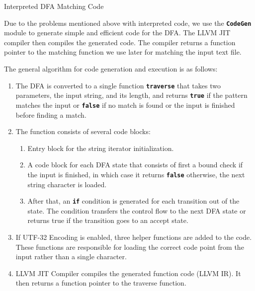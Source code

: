 \begin{listing}[htbp]
\inputminted[breaklines=true,frame=lines,linenos]{cpp}{code/interpretted.cpp}
\caption[Interpreted DFA Code]{Interpreted DFA Matching Code}
\label{lst:dfainterpreted}
\end{listing}

Due to the problems mentioned above with interpreted code, we use the \texttt{\textbf{CodeGen}} module to generate simple and efficient code for the DFA. The LLVM JIT compiler then compiles the generated code. The compiler returns a function pointer to the matching function we use later for matching the input text file.

The general algorithm for code generation and execution is as follows:
\begin{enumerate}
    \item The DFA is converted to a single function \texttt{\textbf{traverse}} that takes two parameters, the input string, and its length, and returns \texttt{\textbf{true}} if the pattern matches the input or \texttt{\textbf{false}} if no match is found or the input is finished before finding a match.
    \item The function consists of several code blocks:
    \begin{enumerate}
        \item Entry block for the string iterator initialization.
        \item A code block for each DFA state that consists of first a bound check if the input is finished, in which case it returns \texttt{\textbf{false}} otherwise, the next string character is loaded.
        \item After that, an \texttt{\textbf{if}} condition is generated for each transition out of the state. The condition transfers the control flow to the next DFA state or returns true if the transition goes to an accept state.
    \end{enumerate}
    \item If UTF-32 Encoding is enabled, three helper functions are added to the code. These functions are responsible for loading the correct code point from the input rather than a single character.
    \item LLVM JIT Compiler compiles the generated function code (LLVM IR). It then returns a function pointer to the traverse function.
\end{enumerate}

